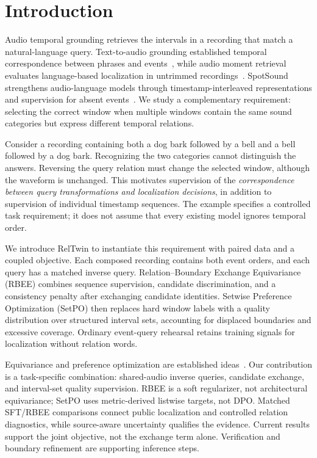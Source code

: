 \section{Introduction}
Audio temporal grounding retrieves the intervals in a recording that match a natural-language query. Text-to-audio grounding established temporal correspondence between phrases and events~\cite{xu2021grounding}, while audio moment retrieval evaluates language-based localization in untrimmed recordings~\cite{munakata2025amr}. SpotSound strengthens audio-language models through timestamp-interleaved representations and supervision for absent events~\cite{sun2026spotsound}. We study a complementary requirement: selecting the correct window when multiple windows contain the same sound categories but express different temporal relations.

Consider a recording containing both a dog bark followed by a bell and a bell followed by a dog bark. Recognizing the two categories cannot distinguish the answers. Reversing the query relation must change the selected window, although the waveform is unchanged. This motivates supervision of the \emph{correspondence between query transformations and localization decisions}, in addition to supervision of individual timestamp sequences. The example specifies a controlled task requirement; it does not assume that every existing model ignores temporal order.

We introduce RelTwin to instantiate this requirement with paired data and a coupled objective. Each composed recording contains both event orders, and each query has a matched inverse query. Relation--Boundary Exchange Equivariance (RBEE) combines sequence supervision, candidate discrimination, and a consistency penalty after exchanging candidate identities. Setwise Preference Optimization (SetPO) then replaces hard window labels with a quality distribution over structured interval sets, accounting for displaced boundaries and excessive coverage. Ordinary event-query rehearsal retains training signals for localization without relation words.

Equivariance and preference optimization are established ideas~\cite{cohen2016group,rafailov2023dpo}. Our contribution is a task-specific combination: shared-audio inverse queries, candidate exchange, and interval-set quality supervision. RBEE is a soft regularizer, not architectural equivariance; SetPO uses metric-derived listwise targets, not DPO. Matched SFT/RBEE comparisons connect public localization and controlled relation diagnostics, while source-aware uncertainty qualifies the evidence. Current results support the joint objective, not the exchange term alone. Verification and boundary refinement are supporting inference steps.
